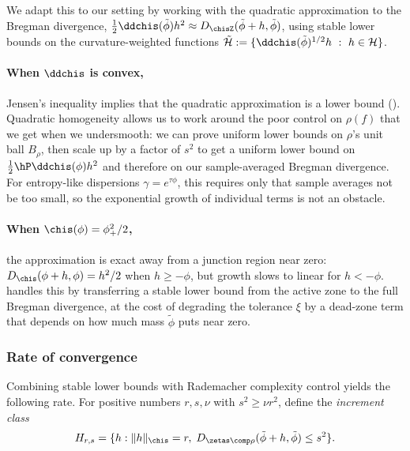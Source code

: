 \documentclass{article}
\begin{document}
We adapt this to our setting by working with the quadratic approximation to the Bregman divergence, $\frac{1}{2}\ddchis(\tilde\phi)h^2 \approx D_{\chisZ}(\tilde\phi + h, \tilde\phi)$, using stable lower bounds on the curvature-weighted functions $\tilde{\mathcal{H}} := \{ \ddchis(\tilde\phi)^{1/2}h \ : \ h \in \mathcal{H} \}$.

\paragraph{When $\ddchis$ is convex,} Jensen's inequality implies that the quadratic approximation is a lower bound (). Quadratic homogeneity allows us to work around the poor control on $\rho(f)$ that we get when we undersmooth: we can prove uniform lower bounds on $\rho$'s unit ball $B_\rho$, then scale up by a factor of $s^2$ to get a uniform lower bound on $\frac{1}{2}\hP \ddchis(\phi)h^2$ and therefore on our sample-averaged Bregman divergence. For entropy-like dispersions $\gamma = e^{\tau\phi}$, this requires only that sample averages not be too small, so the exponential growth of individual terms is not an obstacle.

\paragraph{When $\chis(\phi)=\phi_+^2/2$,}
the approximation is exact away from
a junction region near zero:
$D_\chis(\phi+h, \phi) = h^2/2$
when $h \ge -\phi$,
but growth slows to linear for $h < -\phi$.
 handles this
by transferring a stable lower bound
from the active zone
to the full Bregman divergence,
at the cost of degrading the tolerance $\xi$
by a dead-zone term
that depends on how much mass
$\tilde\phi$ puts near zero.

\subsubsection{Rate of convergence}

Combining stable lower bounds with Rademacher complexity control yields the following rate. For positive numbers $r, s, \nu$ with $s^2 \ge \nu r^2$, define the \emph{increment class}
\[
H_{r,s} = \{h : \|h\|_{\chis} = r,\; D_{\zetas \comp \rho}(\tilde\phi + h, \tilde\phi) \le s^2\}.
\]
\end{document}
